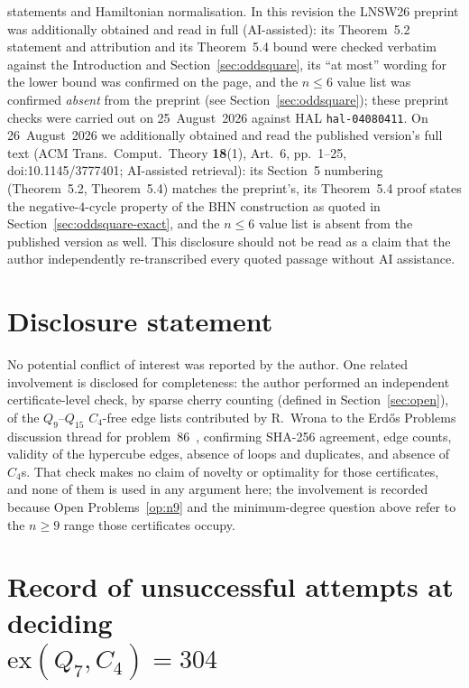 \documentclass[12pt,a4paper]{article}
\theoremstyle{definition}
\newcommand{\ex}{\mathrm{ex}}
\begin{document}
statements and Hamiltonian normalisation. In this revision the LNSW26
preprint was additionally obtained and read in full (AI-assisted): its
Theorem~5.2 statement and attribution and its Theorem~5.4 bound were checked
verbatim against the Introduction and Section~\ref{sec:oddsquare}, its ``at
most'' wording for the lower bound was confirmed on the page, and the
$n\le6$ value list was confirmed \emph{absent} from the preprint (see
Section~\ref{sec:oddsquare}); these preprint checks were carried out on
25~August~2026 against HAL \texttt{hal-04080411}. On 26~August~2026 we
additionally obtained and read the published version's full text (ACM
Trans.\ Comput.\ Theory \textbf{18}(1), Art.~6, pp.~1--25,
doi:10.1145/3777401; AI-assisted retrieval): its Section~5 numbering
(Theorem~5.2, Theorem~5.4) matches the preprint's, its Theorem~5.4 proof
states the negative-$4$-cycle property of the BHN construction as quoted
in Section~\ref{sec:oddsquare-exact}, and the $n\le6$ value list is
absent from the published version as well. This disclosure should not be read
as a claim that the author independently re-transcribed every quoted passage
without AI assistance.

\section*{Disclosure statement}
No potential conflict of interest was reported by the author. One related
involvement is disclosed for completeness: the author performed an independent
certificate-level check, by sparse cherry counting (defined in
Section~\ref{sec:open}), of the $Q_9$--$Q_{15}$
$C_4$-free edge lists contributed by R.~Wrona to the Erd\H{o}s Problems
discussion thread for problem~86~\cite{EP86}, confirming SHA-256 agreement,
edge counts, validity of the hypercube edges, absence of loops and duplicates,
and absence of $C_4$s. That check makes no claim of novelty or optimality for
those certificates, and none of them is used in any argument here; the
involvement is recorded because Open Problems~\ref{op:n9} and the minimum-degree
question above refer to the $n\ge9$ range those certificates occupy.

\appendix
\section[Record of unsuccessful attempts at deciding ex(Q7,C4)=304]{Record
  of unsuccessful attempts at deciding\\
  \texorpdfstring{$\ex(Q_7,C_4)=304$}{ex(Q7,C4)=304}}\label{app:attempts}
\end{document}
